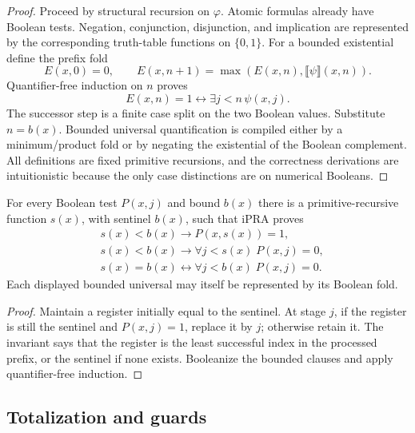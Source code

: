\begin{proof}
Proceed by structural recursion on $\varphi$.  Atomic formulas already have Boolean tests.  Negation, conjunction, disjunction, and implication are represented by the corresponding truth-table functions on $\{0,1\}$.  For a bounded existential define the prefix fold
\[
 E(x,0)=0,\qquad
 E(x,n+1)=\max(E(x,n),\llbracket\psi\rrbracket(x,n)).
\]
Quantifier-free induction on $n$ proves
\[
 E(x,n)=1\leftrightarrow \exists j<n\,\psi(x,j).
\]
The successor step is a finite case split on the two Boolean values.  Substitute $n=b(x)$.  Bounded universal quantification is compiled either by a minimum/product fold or by negating the existential of the Boolean complement.  All definitions are fixed primitive recursions, and the correctness derivations are intuitionistic because the only case distinctions are on numerical Booleans.
\end{proof}

\begin{corollary}
\label{cor:first-witness}
For every Boolean test $P(x,j)$ and bound $b(x)$ there is a primitive-recursive function $s(x)$, with sentinel $b(x)$, such that iPRA proves
\[
\begin{split}
  &s(x)<b(x)\to P(x,s(x))=1,\\
  &s(x)<b(x)\to \forall j<s(x)\;P(x,j)=0,\\
  &s(x)=b(x)\leftrightarrow\forall j<b(x)\;P(x,j)=0.
\end{split}
\]
Each displayed bounded universal may itself be represented by its Boolean fold.
\end{corollary}

\begin{proof}
Maintain a register initially equal to the sentinel.  At stage $j$, if the register is still the sentinel and $P(x,j)=1$, replace it by $j$; otherwise retain it.  The invariant says that the register is the least successful index in the processed prefix, or the sentinel if none exists.  Booleanize the bounded clauses and apply quantifier-free induction.
\end{proof}

\subsection{Totalization and guards}

